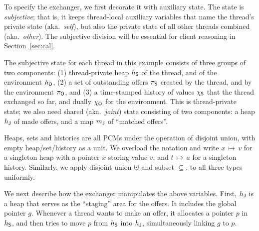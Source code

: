 To specify the exchanger, we first decorate it with auxiliary
state. The state is \emph{subjective}; that is, it keeps thread-local
auxiliary variables that name the thread's private state
(aka.~\emph{self}), but also the private state of all other threads
combined (aka.~\emph{other}).  The subjective division will be
essential for client reasoning in Section~\ref{sec:cal}.
%
%

The subjective state for each thread in this example consists of three
groups of two components: (1) thread-private heap $h_{\mathsf{S}}$ of the
thread, and of the environment $h_{\mathsf{O}}$, (2) a set of outstanding
offers $\pi_{\mathsf{S}}$ created by the thread, and by the environment
$\pi_{\mathsf{O}}$, and (3) a time-stamped history of values $\chi_{\mathsf{S}}$ that the
thread exchanged so far, and dually $\chi_{\mathsf{O}}$ for the environment.
This is thread-private state; we also need shared (aka.~\emph{joint})
state consisting of two components: a heap $h_{\mathsf{J}}$ of made offers,
and a map ${m_{\mathsf{J}}}$ of ``matched offers''.

Heaps, sets and histories are all PCMs under the operation of disjoint
union, with empty heap/set/history as a unit. We overload the notation
and write $x\,{\mapsto}\,v$ for a singleton heap with a pointer $x$
storing value $v$, and $t\,{\mapsto}\,a$ for a singleton
history. Similarly, we apply disjoint union $\hunion$ and subset
$\subseteq$, to all three types uniformly.

We next describe how the exchanger manipulates the above variables.
First, $h_{\mathsf{J}}$ is a heap that serves as the ``staging'' area for the
offers. It includes the global pointer $g$. Whenever a thread wants to
make an offer, it allocates a pointer $p$ in $h_{\mathsf{S}}$, and then tries
to move $p$ from $h_{\mathsf{S}}$ into $h_{\mathsf{J}}$, simultaneously linking $g$ to
$p$.

